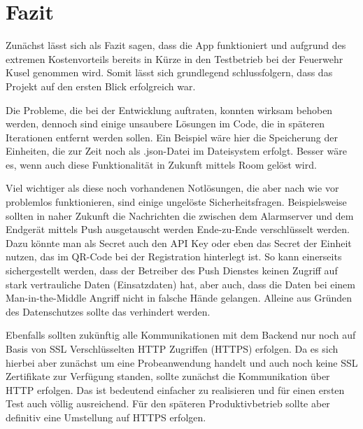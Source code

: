 \section{Fazit}
\label{sec:fazit}
Zunächst lässt sich als Fazit sagen, dass die App funktioniert und aufgrund des extremen Kostenvorteils bereits in Kürze in den Testbetrieb bei der Feuerwehr Kusel genommen wird. Somit lässt sich grundlegend schlussfolgern, dass das Projekt auf den ersten Blick erfolgreich war.

Die Probleme, die bei der Entwicklung auftraten, konnten wirksam behoben werden, dennoch sind einige unsaubere Lösungen im Code, die in späteren Iterationen entfernt werden sollen. Ein Beispiel wäre hier die Speicherung der Einheiten, die zur Zeit noch als .json-Datei im Dateisystem erfolgt. Besser wäre es, wenn auch diese Funktionalität in Zukunft mittels Room gelöst wird.

Viel wichtiger als diese noch vorhandenen Notlösungen, die aber nach wie vor problemlos funktionieren, sind einige ungelöste Sicherheitsfragen. Beispielsweise sollten in naher Zukunft die Nachrichten die zwischen dem Alarmserver und dem Endgerät mittels Push ausgetauscht werden Ende-zu-Ende verschlüsselt werden. Dazu könnte man als Secret auch den API Key oder eben das Secret der Einheit nutzen, das im QR-Code bei der Registration hinterlegt ist. So kann einerseits sichergestellt werden, dass der Betreiber des Push Dienstes keinen Zugriff auf stark vertrauliche Daten (Einsatzdaten) hat, aber auch, dass die Daten bei einem Man-in-the-Middle Angriff nicht in falsche Hände gelangen. Alleine aus Gründen des Datenschutzes sollte das verhindert werden.

Ebenfalls sollten zukünftig alle Kommunikationen mit dem Backend nur noch auf Basis von SSL Verschlüsselten HTTP Zugriffen (HTTPS) erfolgen. Da es sich hierbei aber zunächst um eine Probeanwendung handelt und auch noch keine SSL Zertifikate zur Verfügung standen, sollte zunächst die Kommunikation über HTTP erfolgen. Das ist bedeutend einfacher zu realisieren und für einen ersten Test auch völlig ausreichend. Für den späteren Produktivbetrieb sollte aber definitiv eine Umstellung auf HTTPS erfolgen.